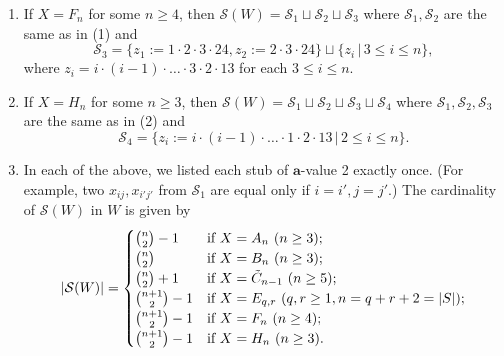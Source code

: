 \documentclass[ALCO,Unicode,published]{cedram}
\newcommand{\cals}{\mathcal{S}}
\newcommand{\la}{\mathbf{a}}
\newcommand{\sx}{\mathcal{S}(W)}
\newcommand{\abs}[1]{\lvert #1 \rvert}
\begin{document}
\begin{thm}
\begin{enumerate}
\[\begin{cases}
                \end{cases}
            \]
        \item If $X=F_n$ for some $n\ge 4$, then $\sx=\cals_1\sqcup\cals_2\sqcup\cals_3$
            where  $\cals_1,\cals_2$ are the same as in \textup{(}1\textup{)} and 
            \[
                \cals_3=\{
                    z_1:=1\cdot 2\cdot 3\cdot 24, z_2:=2\cdot 3\cdot
                24\}\sqcup\{z_i\,\vert\, 3\le i\le n\}, 
            \]
            where $z_i=i\cdot (i-1)\cdot \ldots\cdot 3\cdot 2\cdot 13$ for each $3\le i\le n$.
        \item If $X=H_n$ for some $n\ge 3$, then $\sx=\cals_1\sqcup\cals_2\sqcup\cals_3\sqcup\cals_4$ where
            $\cals_1,\cals_2,\cals_3$ are the same as in \textup{(}2\textup{)} and 
            \[
                \cals_4=\{z_i:=i\cdot (i-1)\cdot \ldots\cdot 1\cdot 2\cdot 13\,\vert\,
                2\le i\le n\}.
            \]
        \item In each of the above, we listed each stub of $\la$-value 2 exactly once. {\textup{(}}For example, two
            $x_{ij},x_{i'j'}$ from $ \cals_1$ are equal only if $i=i',j=j'$.{\textup{)}} The cardinality of $\sx$ 
            in $W$ is given by 
            \[ 
                \abs{\sx}=
                \begin{cases}\binom{n}{2} -1 & \text{if $X=A_n$ \textup{(}$n\ge 3$\textup{)}};\\ 
                    \binom{n}{2} & \text{if
                      $X=B_n$ \textup{(}$n\ge 3$\textup{)}};\\ 
                      \binom{n}{2} +1 & \text{if $X=\tilde C_{n-1}$
                      \textup{(}$n\ge 5$\textup{)}};\\ 
                      \binom{n+1}{2}-1 & \text{if $X= E_{q,r}$ \textup{(}$q,r\ge 1, n=q+r+2=\abs{S}$\textup{)}};\\ 
                      \binom{n+1}{2}-1 & \text{if $X= F_n$ \textup{(}$n\ge 4$\textup{)}};\\
                      \binom{n+1}{2}-1 & \text{if $X= H_n$ \textup{(}$n\ge 3$\textup{)}}.
                \end{cases} 
            \]
    \end{enumerate}
\end{thm}
\end{document}
